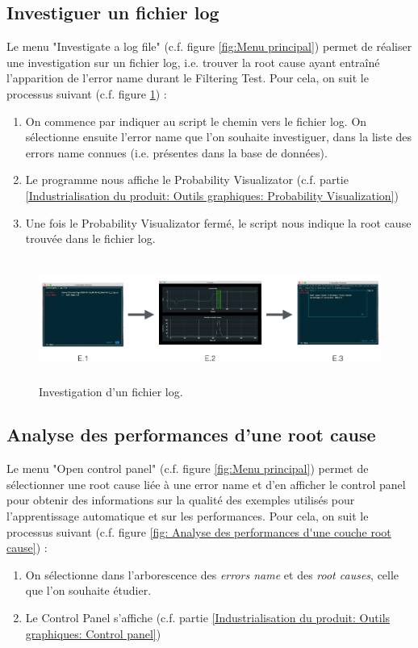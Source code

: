 \subsection{Investiguer un fichier log}
\label{Industrialisation du produit: Utilisation suggérée des outils: Investiguer}
Le menu "Investigate a log file" (c.f. figure \ref{fig:Menu principal}) permet de réaliser une investigation sur un fichier log, i.e. trouver la root cause ayant entraîné l'apparition de l'error name durant le Filtering Test. Pour cela, on suit le processus suivant (c.f. figure \ref{fig: Investigation d'un fichier log}) : 
\begin{enumerate}
	\item On commence par indiquer au script le chemin vers le fichier log. On sélectionne ensuite l'error name que l'on souhaite investiguer, dans la liste des errors name connues (i.e. présentes dans la base de données).
	\item Le programme nous affiche le Probability Visualizator (c.f. partie \ref{Industrialisation du produit: Outils graphiques: Probability Visualization})
	\item Une fois le Probability Visualizator fermé, le script nous indique la root cause trouvée dans le fichier log. 
\end{enumerate}

\begin{figure}[H]
	\centering\includegraphics[height=4cm]{images/invest_menu.png}
	\caption[Investigation d'un fichier log]{Investigation d'un fichier log.}
	\label{fig: Investigation d'un fichier log}
\end{figure} 

\subsection{Analyse des performances d'une  root cause}
\label{Industrialisation du produit: Utilisation suggérée des outils: Analyse des performances d'une  root cause}
Le menu "Open control panel" (c.f. figure \ref{fig:Menu principal}) permet de sélectionner une root cause liée à une error name et d'en afficher le control panel pour obtenir des informations sur la qualité des exemples utilisés pour l'apprentissage automatique et sur les performances. Pour cela, on suit le processus suivant (c.f. figure \ref{fig: Analyse des performances d'une couche root cause}) : 
\begin{enumerate}
	\item On sélectionne dans l'arborescence des \emph{errors name} et des\emph{ root causes}, celle que l'on souhaite étudier.
	\item Le Control Panel s'affiche (c.f. partie \ref{Industrialisation du produit: Outils graphiques: Control panel})
\end{enumerate}

